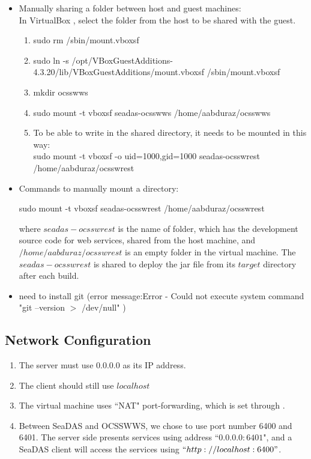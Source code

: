 \documentclass[11pt, oneside]{article}   	%
\begin{document}
\begin{itemize}

\item Manually sharing a folder between host and guest machines: \\
In VirtualBox {\color{blue}{\bf Devices  $\rightarrow $  Shared Folder Settings...  $\rightarrow $ Shared Folders  $\rightarrow $  Machine Folders}}, select the folder from the host to be shared with the guest.
   \begin{enumerate}
      \item sudo rm /sbin/mount.vboxsf
      \item sudo ln -s /opt/VBoxGuestAdditions-4.3.20/lib/VBoxGuestAdditions/mount.vboxsf /sbin/mount.vboxsf
      \item mkdir ocsswws
      \item sudo mount -t vboxsf seadas-ocsswws /home/aabduraz/ocsswws
      \item To be able to write in the shared directory, it needs to be mounted in this way:\\
      sudo mount -t vboxsf -o uid=1000,gid=1000 seadas-ocsswrest /home/aabduraz/ocsswrest

   \end{enumerate}

\item Commands to manually mount a directory:
\begin{code}
sudo mount -t vboxsf seadas-ocsswrest /home/aabduraz/ocsswrest
\end{code}
where $seadas-ocsswrest$ is the name of folder, which has the development source code for web services, shared from the host machine, and $/home/aabduraz/ocsswrest$ is an empty folder in the virtual machine. The  $seadas-ocsswrest$ is shared to deploy the jar file from its $target$ directory after each build. 

\item need to install git
(error message:Error - Could not execute system command "git --version $>$ /dev/null" )

\end{itemize}

\subsection{Network Configuration}
\begin{enumerate}
\item The server must use $0.0.0.0$ as its IP address.
\item The client should still use $localhost$
\item The virtual machine uses ``NAT" port-forwarding, which is set through {\color{blue}{\bf Devices $\rightarrow$ Network $\rightarrow$ Network Settings ... }}.
\item  Between SeaDAS and OCSSWWS, we chose to use port number 6400 and 6401. The server side presents services using address ``$0.0.0.0:6401$", and a SeaDAS client will access the services using $``http://localhost:6400"$.
\end{enumerate}
\end{document}
